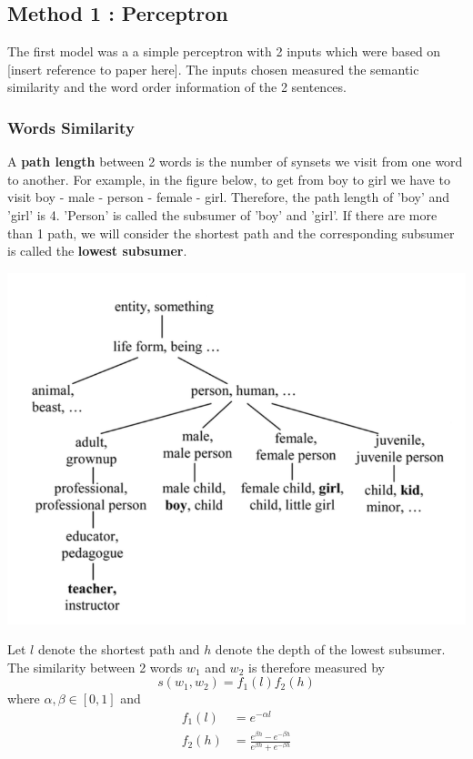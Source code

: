 \subsection{Method 1 : Perceptron}

The first model was a a simple perceptron with 2 inputs which were based on [insert reference to paper here]. The inputs chosen measured the semantic similarity and the word order information of the 2 sentences.

\subsubsection{Words Similarity}
A \textbf{path length} between 2 words is the number of synsets we visit from one word to another. For example, in the figure below, to get from boy to girl we have to visit boy - male - person - female - girl. Therefore, the path length of 'boy' and 'girl' is 4. 'Person' is called the subsumer of 'boy' and 'girl'. If there are more than 1 path, we will consider the shortest path and the corresponding subsumer is called the \textbf{lowest subsumer}.

\begin{center}
\includegraphics[scale=0.7]{Synset_tree}
\end{center}

Let $l$ denote the shortest path and $h$ denote the depth of the lowest subsumer. The similarity between 2 words $w_1$ and $w_2$ is therefore measured by 
\begin{equation*}
s(w_1, w_2) = f_1(l) f_2(h)
\end{equation*}
where $\alpha, \beta \in [0,1]$ and 
\begin{align*}
	f_1(l)		&= e^{-\alpha l} \\
	f_2(h)	&= \frac{e^{\beta h} - e^{-\beta h}}{e^{\beta h} + e^{-\beta h}} \\
\end{align*}

